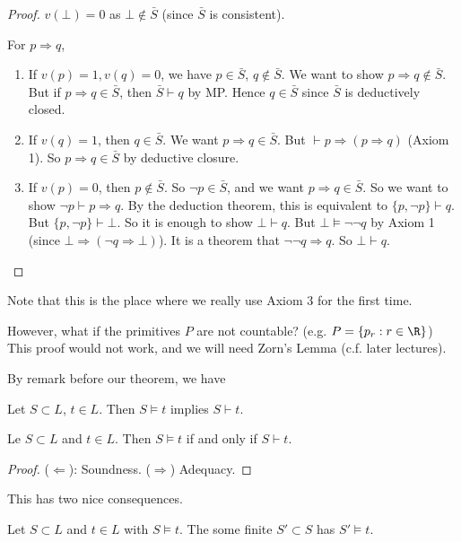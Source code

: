 \documentclass[a4paper]{article}
\begin{document}
\begin{proof}
  $v(\bot) = 0$ as $\bot \not\in \bar S$ (since $\bar S$ is consistent).

  For $p\Rightarrow q$,
  \begin{enumerate}
    \item If $v(p) = 1, v(q) = 0$, we have $p\in \bar S$, $q\not\in \bar S$. We want to show $p\Rightarrow q\not\in \bar S$. But if $p\Rightarrow q\in \bar S$, then $\bar S \vdash q$ by MP. Hence $q\in \bar S$ since $\bar S$ is deductively closed.
    \item If $v(q) = 1$, then $q\in \bar S$. We want $p\Rightarrow q\in \bar S$. But $\vdash p\Rightarrow (p\Rightarrow q)$ (Axiom 1). So $p\Rightarrow q \in \bar S$ by deductive closure.
    \item If $v(p) = 0$, then $p\not\in \bar S$. So $\neg p\in \bar S$, and we want $p\Rightarrow q\in \bar S$. So we want to show $\neg p\vdash p\Rightarrow q$. By the deduction theorem, this is equivalent to $\{p, \neg p\} \vdash q$. But $\{p, \neg p\}\vdash \bot$. So it is enough to show $\bot \vdash q$. But $\bot \models \neg \neg q$ by Axiom 1 (since $\bot \Rightarrow (\neg q\Rightarrow \bot)$). It is a theorem that $\neg \neg q\Rightarrow q$. So $\bot \vdash q$. 
  \end{enumerate}
\end{proof}
Note that this is the place where we really use Axiom 3 for the first time.

However, what if the primitives $P$ are not countable? (e.g. $P = \{p_r: r\in \R\}$) This proof would not work, and we will need Zorn's Lemma (c.f. later lectures).

By remark before our theorem, we have
\begin{cor}
  Let $S\subset L$, $t\in L$. Then $S\models t$ implies $S\vdash t$. 
\end{cor}

\begin{thm}
  Le $S\subset L$ and $t\in L$. Then $S\models t$ if and only if $S\vdash t$.
\end{thm}

\begin{proof}
  ($\Leftarrow$): Soundness. ($\Rightarrow $) Adequacy.
\end{proof}

This has two nice consequences.
\begin{cor}
  Let $S\subset L$ and $t\in L$ with $S\models t$. The some finite $S'\subset S$ has $S'\models t$.
\end{cor}
\end{document}

